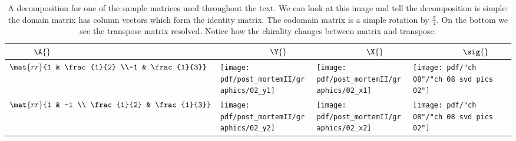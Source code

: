 \begin{landscape}
\thispagestyle{empty}
\begin{table}[htdp]
\begin{center}
\begin{tabular}{m{0.75in}m{1.75in}m{1.75in}m{1.75in}}
  $ \quad \qquad \A{}$ & $\qquad \qquad \qquad \Y{}$ & $\qquad \qquad \qquad \X{}$ & $\qquad \qquad \qquad \sig{}$ \\ \hline\hline
  $\mat{rr}{1 & \frac{1}{2} \\-1 & \frac{1}{3}}$ \qquad & \qquad 
  \texttt{[image: pdf/post\_mortemII/graphics/02\_y1]} \qquad & \qquad 
  \texttt{[image: pdf/post\_mortemII/graphics/02\_x1]} \qquad & \qquad 
  \texttt{[image: pdf/"ch 08"/"ch 08 svd pics 02"]} \\
  $\mat{rr}{1 & -1 \\ \frac{1}{2} & \frac{1}{3}}$ \qquad & \qquad 
  \texttt{[image: pdf/post\_mortemII/graphics/02\_y2]} \qquad & \qquad 
  \texttt{[image: pdf/post\_mortemII/graphics/02\_x2]} \qquad & \qquad 
  \texttt{[image: pdf/"ch 08"/"ch 08 svd pics 02"]} \\
\end{tabular}
\end{center}
\caption[A decomposition for one of the sample matrices]{A decomposition for one of the sample matrices used throughout the text. We can look at this image and tell the decomposition is simple: the domain matrix has column vectors which form the identity matrix. The codomain matrix is a simple rotation by $\frac{\pi}{4}$. On the bottom we see the transpose matrix resolved. Notice how the chirality changes between matrix and transpose.}
\label{tab:pmII:visualsb}
\end{table}%
\end{landscape}

